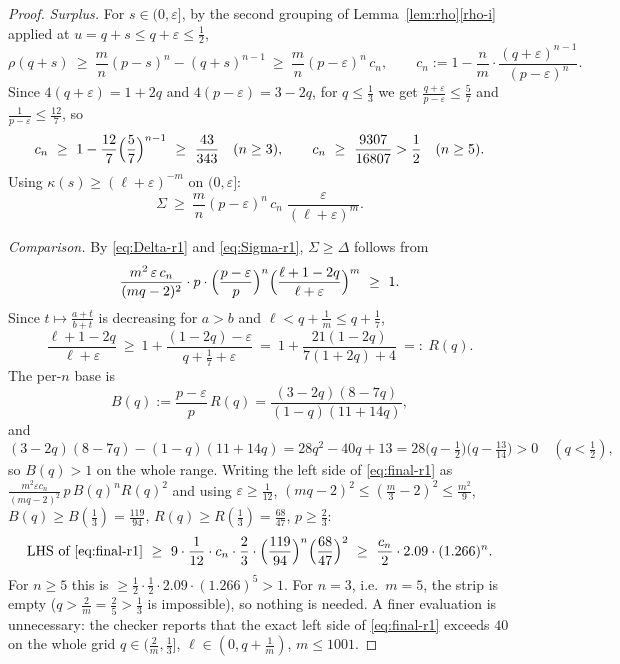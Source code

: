 \documentclass[11pt]{article}
\begin{document}
\begin{proof}
\emph{Surplus.}  For $s\in(0,\varepsilon]$, by the second grouping of Lemma~\ref{lem:rho}\ref{rho-i} applied at $u=q+s\le q+\varepsilon\le\tfrac12$,
\[
        \rho(q+s)\ \ge\ \frac mn(p-s)^n-(q+s)^{n-1}
        \ \ge\ \frac mn(p-\varepsilon)^n\,c_n,
        \qquad
        c_n:=1-\frac nm\cdot\frac{(q+\varepsilon)^{n-1}}{(p-\varepsilon)^n}.
\]
Since $4(q+\varepsilon)=1+2q$ and $4(p-\varepsilon)=3-2q$, for $q\le\tfrac13$ we get $\frac{q+\varepsilon}{p-\varepsilon}\le\frac57$ and $\frac1{p-\varepsilon}\le\frac{12}7$, so
\begin{equation}\label{eq:cn}
        c_n\ \ge\ 1-\frac{12}7\Bigl(\frac57\Bigr)^{n-1}\ \ge\ \frac{43}{343}\quad(n\ge3),
        \qquad
        c_n\ \ge\ \frac{9307}{16807}>\frac12\quad(n\ge5).
\end{equation}
Using $\kappa(s)\ge(\ell+\varepsilon)^{-m}$ on $(0,\varepsilon]$:
\begin{equation}\label{eq:Sigma-r1}
        \Sigma\ \ge\ \frac mn(p-\varepsilon)^n\,c_n\;\frac{\varepsilon}{(\ell+\varepsilon)^{m}} .
\end{equation}

\emph{Comparison.}  By \eqref{eq:Delta-r1} and \eqref{eq:Sigma-r1}, $\Sigma\ge\Delta$ follows from
\begin{equation}\label{eq:final-r1}
        \frac{m^2\,\varepsilon\,c_n}{(mq-2)^2}\cdot p\cdot
        \Bigl(\frac{p-\varepsilon}{p}\Bigr)^{n}\Bigl(\frac{\ell+1-2q}{\ell+\varepsilon}\Bigr)^{m}\ \ge\ 1 .
\end{equation}
Since $t\mapsto\frac{a+t}{b+t}$ is decreasing for $a>b$ and $\ell<q+\frac1m\le q+\frac17$,
\[
        \frac{\ell+1-2q}{\ell+\varepsilon}
        \ \ge\ 1+\frac{(1-2q)-\varepsilon}{q+\frac17+\varepsilon}
        \ =\ 1+\frac{21(1-2q)}{7(1+2q)+4}\ =:\ R(q) .
\]
The per-$n$ base is
\[
        B(q):=\frac{p-\varepsilon}{p}\,R(q)
        =\frac{(3-2q)(8-7q)}{(1-q)(11+14q)},
\]
and
\[
        (3-2q)(8-7q)-(1-q)(11+14q)=28q^2-40q+13=28\bigl(q-\tfrac12\bigr)\bigl(q-\tfrac{13}{14}\bigr)>0
        \quad(q<\tfrac12),
\]
so $B(q)>1$ on the whole range.  Writing the left side of \eqref{eq:final-r1} as
$\frac{m^2\varepsilon c_n}{(mq-2)^2}\,p\,B(q)^nR(q)^2$ and using $\varepsilon\ge\frac1{12}$, $(mq-2)^2\le(\frac m3-2)^2\le\frac{m^2}9$, $B(q)\ge B(\tfrac13)=\frac{119}{94}$, $R(q)\ge R(\tfrac13)=\frac{68}{47}$, $p\ge\tfrac23$:
\[
        \text{LHS of \eqref{eq:final-r1}}\ \ge\
        9\cdot\frac1{12}\cdot c_n\cdot\frac23\cdot\Bigl(\frac{119}{94}\Bigr)^{n}\Bigl(\frac{68}{47}\Bigr)^{2}
        \ \ge\ \frac{c_n}{2}\cdot2.09\cdot(1.266)^{n}.
\]
For $n\ge5$ this is $\ge\frac12\cdot\frac12\cdot2.09\cdot(1.266)^5>1$.  For $n=3$, i.e.\ $m=5$, the strip is empty ($q>\frac2m=\frac25>\frac13$ is impossible), so nothing is needed.  A finer evaluation is unnecessary: the checker reports that the exact left side of \eqref{eq:final-r1} exceeds $40$ on the whole grid $q\in(\frac2m,\frac13]$, $\ell\in(0,q+\frac1m)$, $m\le1001$.


\end{proof}
\end{document}

